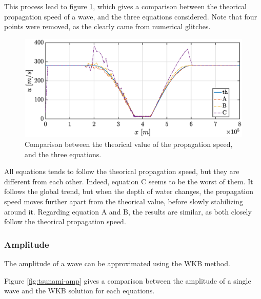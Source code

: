 \documentclass[a4paper,12pt,twoside]{article}
\begin{document}
        This process lead to figure \ref{fig:tsunami_speed}, which gives a comparison between the theorical propagation speed of a wave, and the three equations considered.
        Note that four points were removed, as the clearly came from numerical glitches.

        \begin{figure}[h]
          \centering
          \includegraphics[width=\textwidth]{graphs/tsunami_speed.eps}
          \caption{Comparison between the theorical value of the propagation speed, and the three equations.}
          \label{fig:tsunami_speed}
        \end{figure}

        All equations tends to follow the theorical propagation speed, but they are different from each other.
        Indeed, equation C seems to be the worst of them.
        It follows the global trend, but when the depth of water changes, the propagation speed moves further apart from the theorical value, before slowly stabilizing around it.
        Regarding equation A and B, the results are similar, as both closely follow the theorical propagation speed.

      \subsubsection{Amplitude}
      The amplitude of a wave can be approximated using the WKB method.

      Figure \ref{fig:tsunami-amp} gives a comparison between the amplitude of a single wave and the WKB solution for each equations.
\end{document}
